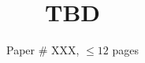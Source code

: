 \documentclass[sigconf,10pt]{acmart}
\begin{document}
\title{TBD}


\author{Paper \# XXX, $\leq 12$ pages}

\renewcommand{\shortauthors}{X.et al.}

\begin{abstract}
\end{abstract}

\maketitle



 
 
\end{document}
